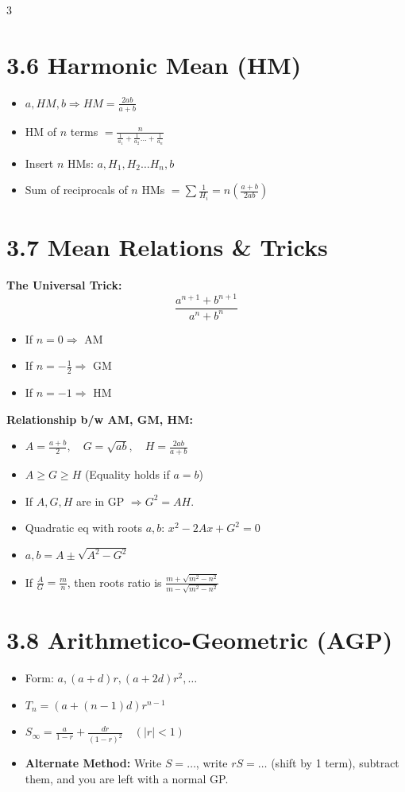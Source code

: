 \documentclass[11pt,a4paper,landscape]{article}
\begin{document}
\begin{multicols*}{3}
\section*{3.6 Harmonic Mean (HM)}
\begin{itemize}
\item $a, HM, b \Rightarrow HM = \frac{2ab}{a+b}$
\item HM of $n$ terms $= \frac{n}{\frac{1}{a_1} + \frac{1}{a_2} \dots + \frac{1}{a_n}}$
\item Insert $n$ HMs: $a, H_1, H_2 \dots H_n, b$
\item Sum of reciprocals of $n$ HMs $= \sum \frac{1}{H_i} = n\left(\frac{a+b}{2ab}\right)$
\end{itemize}

\section*{3.7 Mean Relations \& Tricks}
\textbf{The Universal Trick:}
$$ \frac{a^{n+1} + b^{n+1}}{a^n + b^n} $$
\begin{itemize}
\item If $n=0 \Rightarrow$ AM
\item If $n=-\frac{1}{2} \Rightarrow$ GM
\item If $n=-1 \Rightarrow$ HM
\end{itemize}

\textbf{Relationship b/w AM, GM, HM:}
\begin{itemize}
\item $A = \frac{a+b}{2}, \quad G = \sqrt{ab}, \quad H = \frac{2ab}{a+b}$
\item $A \ge G \ge H$ (Equality holds if $a=b$)
\item If $A, G, H$ are in GP $\Rightarrow G^2 = AH$.
\item Quadratic eq with roots $a,b$: $x^2 - 2Ax + G^2 = 0$
\item $a, b = A \pm \sqrt{A^2 - G^2}$
\item If $\frac{A}{G} = \frac{m}{n}$, then roots ratio is $\frac{m + \sqrt{m^2-n^2}}{m - \sqrt{m^2-n^2}}$
\end{itemize}

\section*{3.8 Arithmetico-Geometric (AGP)}
\begin{itemize}
\item Form: $a, (a+d)r, (a+2d)r^2, \dots$
\item $T_n = (a+(n-1)d)r^{n-1}$
\item $S_\infty = \frac{a}{1-r} + \frac{dr}{(1-r)^2} \quad (|r|<1)$
\item \textbf{Alternate Method:} Write $S = \dots$, write $rS = \dots$ (shift by 1 term), subtract them, and you are left with a normal GP.
\end{itemize}


\end{multicols*}
\end{document}
